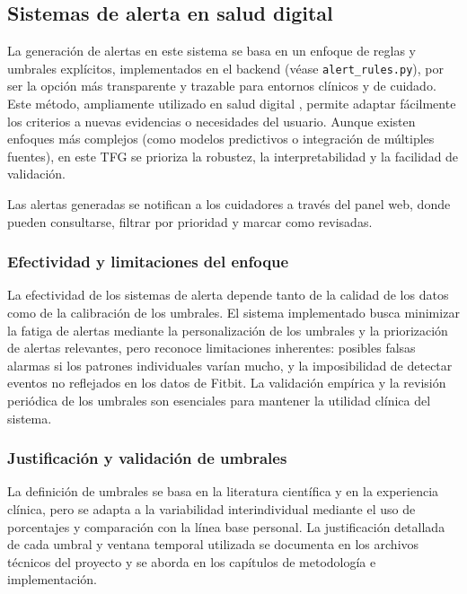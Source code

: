 \subsection{Sistemas de alerta en salud digital}
\label{subsec:sistemas_alerta_comparativa}

La generación de alertas en este sistema se basa en un enfoque de reglas y umbrales explícitos, implementados en el backend (véase \texttt{alert\_rules.py}), por ser la opción más transparente y trazable para entornos clínicos y de cuidado. Este método, ampliamente utilizado en salud digital \cite{alam_alert_systems_review_2019}, permite adaptar fácilmente los criterios a nuevas evidencias o necesidades del usuario. Aunque existen enfoques más complejos (como modelos predictivos o integración de múltiples fuentes), en este TFG se prioriza la robustez, la interpretabilidad y la facilidad de validación.

Las alertas generadas se notifican a los cuidadores a través del panel web, donde pueden consultarse, filtrar por prioridad y marcar como revisadas.

\subsubsection{Efectividad y limitaciones del enfoque}
La efectividad de los sistemas de alerta depende tanto de la calidad de los datos como de la calibración de los umbrales. El sistema implementado busca minimizar la fatiga de alertas mediante la personalización de los umbrales y la priorización de alertas relevantes, pero reconoce limitaciones inherentes: posibles falsas alarmas si los patrones individuales varían mucho, y la imposibilidad de detectar eventos no reflejados en los datos de Fitbit. La validación empírica y la revisión periódica de los umbrales son esenciales para mantener la utilidad clínica del sistema.

\subsubsection{Justificación y validación de umbrales}
La definición de umbrales se basa en la literatura científica y en la experiencia clínica, pero se adapta a la variabilidad interindividual mediante el uso de porcentajes y comparación con la línea base personal. La justificación detallada de cada umbral y ventana temporal utilizada se documenta en los archivos técnicos del proyecto y se aborda en los capítulos de metodología e implementación.

